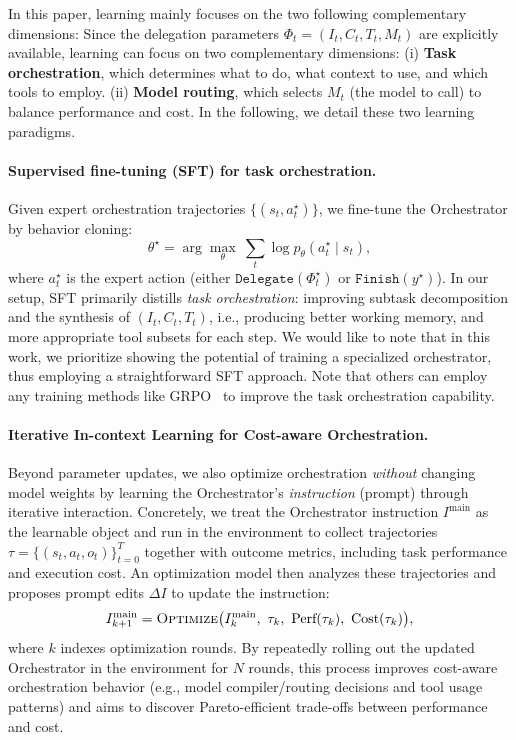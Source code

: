 In this paper, learning mainly focuses on the two following complementary dimensions:
Since the delegation parameters $\Phi_t=(I_t,C_t,T_t,M_t)$ are explicitly available, learning can focus on two complementary dimensions:
(i) \textbf{Task orchestration}, which determines what to do, what context to use, and which tools to employ.
(ii) \textbf{Model routing}, which selects $M_t$ (the model to call) to balance performance and cost.
In the following, we detail these two learning paradigms.

\paragraph{Supervised fine-tuning (SFT) for task orchestration.}
Given expert orchestration trajectories $\{(s_t,a_t^\star)\}$, we fine-tune the Orchestrator by behavior cloning:
\[
\theta^\star = \arg\max_{\theta}\ \sum_{t} \log p_{\theta}(a_t^\star \mid s_t),
\]
where $a_t^\star$ is the expert action (either $\texttt{Delegate}(\Phi_t^\star)$ or $\texttt{Finish}(y^\star)$).
In our setup, SFT primarily distills \emph{task orchestration}: improving subtask decomposition and the synthesis of $(I_t,C_t,T_t)$, i.e., producing better working memory, and more appropriate tool subsets for each step.
We would like to note that in this work, we prioritize showing the potential of training a specialized orchestrator, thus employing a straightforward SFT approach. Note that others can employ any training methods like GRPO~\cite{shao2024deepseekmath} to improve the task orchestration capability.

\paragraph{Iterative In-context Learning for Cost-aware Orchestration.}
Beyond parameter updates, we also optimize orchestration \emph{without} changing model weights by learning the Orchestrator's \emph{instruction} (prompt) through iterative interaction.
Concretely, we treat the Orchestrator instruction $I^{\text{main}}$ as the learnable object and run \our{} in the environment to collect trajectories
$\tau=\{(s_t,a_t,o_t)\}_{t=0}^{T}$ together with outcome metrics, including task performance and execution cost.
An optimization model then analyzes these trajectories and proposes prompt edits $\Delta I$ to update the instruction:
\[
I^{\text{main}}_{k+1} = \textsc{Optimize}\bigl(I^{\text{main}}_{k},\ \tau_k,\ \text{Perf}(\tau_k),\ \text{Cost}(\tau_k)\bigr),
\]
where $k$ indexes optimization rounds.
By repeatedly rolling out the updated Orchestrator in the environment for $N$ rounds, this process improves cost-aware orchestration behavior (e.g., model compiler/routing decisions and tool usage patterns) and aims to discover Pareto-efficient trade-offs between performance and cost.
